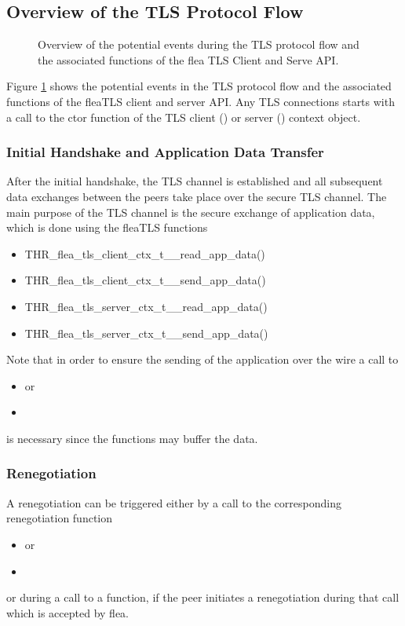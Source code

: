 \documentclass[a4paper,11pt]{scrartcl}
\begin{document}
\subsection{Overview of the TLS Protocol Flow}
\begin{figure}

\caption{Overview of the potential events during the TLS protocol flow and the
associated functions of the flea TLS Client and Serve API.}
\label{figTlsSeqFlow}
\end{figure}

Figure \ref{figTlsSeqFlow} shows the potential events in the TLS protocol flow
and the associated functions of the fleaTLS client and server API. Any TLS
connections starts with a call to the ctor function of the TLS client
(\clientCtx) or server (\serverCtx) context object.

\subsubsection{Initial Handshake and Application Data Transfer}
After the initial handshake, the TLS channel is established and all subsequent
data exchanges between the peers take place over the secure TLS channel. The
main purpose of the TLS channel is the secure exchange of application data,
which is done using the fleaTLS functions 
\begin{itemize}
  \item THR\_flea\_tls\_client\_ctx\_t\_\_read\_app\_data()
  \item THR\_flea\_tls\_client\_ctx\_t\_\_send\_app\_data()
  \item THR\_flea\_tls\_server\_ctx\_t\_\_read\_app\_data()
  \item THR\_flea\_tls\_server\_ctx\_t\_\_send\_app\_data()
\end{itemize}

Note that in order to ensure the sending of the application over the wire a call
to 
\begin{itemize}
  \item {} or
  \item {}
  \end{itemize}
  is necessary since the  functions may buffer the data.

  \subsubsection{Renegotiation}
A renegotiation can be triggered either by a call to the corresponding
renegotiation function
\begin{itemize}
  \item {} or
\item {}
  \end{itemize}
  or during a call to a  function, if the peer initiates a
  renegotiation during that call which is accepted by flea.
\end{document}
